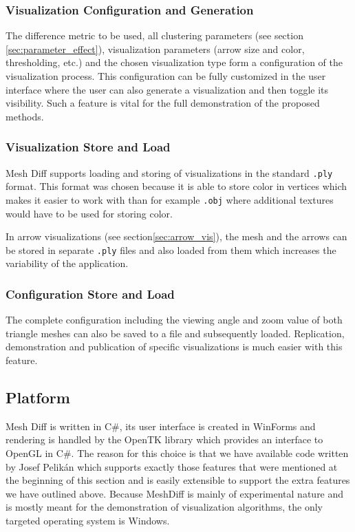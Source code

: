 \subsubsection{Visualization Configuration and Generation}

The difference metric to be used, all clustering parameters (see section \ref{sec:parameter_effect}), visualization parameters (arrow size and color, thresholding, etc.) and the chosen visualization type form a configuration of the visualization process. This configuration can be fully customized in the user interface where the user can also generate a visualization and then toggle its visibility. Such a feature is vital for the full demonstration of the proposed methods.

\subsubsection{Visualization Store and Load}

Mesh Diff supports loading and storing of visualizations in the standard \verb+.ply+ format. This format was chosen because it is able to store color in vertices which makes it easier to work with than for example \verb+.obj+ where additional textures would have to be used for storing color. 

In arrow visualizations (see section\ref{sec:arrow_vis}), the mesh and the arrows  can be stored in separate \verb+.ply+ files and also loaded from them which increases the variability of the application.

\subsubsection{Configuration Store and Load}

The complete configuration including the viewing angle and zoom value of both triangle meshes can also be saved to a file and subsequently loaded. Replication, demonstration and publication of specific visualizations is much easier with this feature.
\subsection{Platform}

Mesh Diff is written in C\#, its user interface is created in WinForms and rendering is handled by the OpenTK library which provides an interface to OpenGL in C\#. The reason for this choice is that we have available code written by Josef Pelikán which supports exactly those features that were mentioned at the beginning of this section and is easily extensible to support the extra features we have outlined above. Because MeshDiff is mainly of experimental nature and is mostly meant for the demonstration of visualization algorithms, the only targeted operating system is Windows.